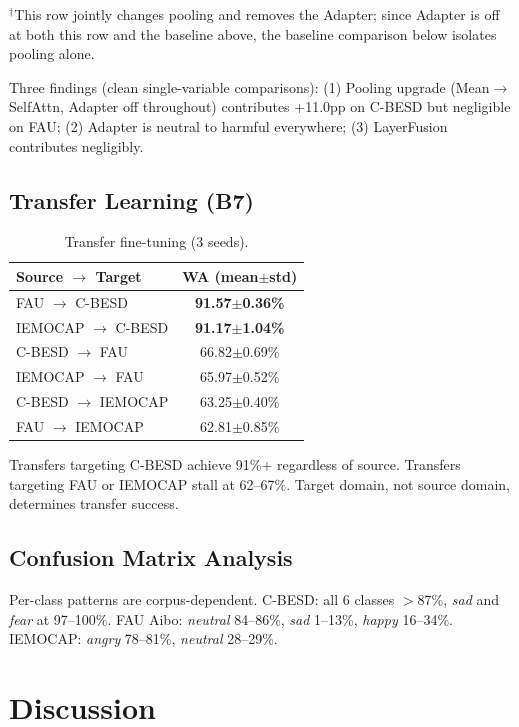 \documentclass[11pt,a4paper]{article}
\begin{document}
\noindent $^\dagger$This row jointly changes pooling and removes the Adapter; since Adapter is off at both this row and the baseline above, the baseline comparison below isolates pooling alone.

Three findings (clean single-variable comparisons): (1) Pooling upgrade (Mean$\rightarrow$SelfAttn, Adapter off throughout) contributes +11.0pp on C-BESD but negligible on FAU; (2) Adapter is neutral to harmful everywhere; (3) LayerFusion contributes negligibly.

\subsection{Transfer Learning (B7)}

\begin{table}[h]
\centering
\caption{Transfer fine-tuning (3 seeds).}
\begin{tabular}{lc}
\hline
\textbf{Source $\rightarrow$ Target} & \textbf{WA (mean$\pm$std)} \\
\hline
FAU $\rightarrow$ C-BESD & \textbf{91.57$\pm$0.36\%} \\
IEMOCAP $\rightarrow$ C-BESD & \textbf{91.17$\pm$1.04\%} \\
C-BESD $\rightarrow$ FAU & 66.82$\pm$0.69\% \\
IEMOCAP $\rightarrow$ FAU & 65.97$\pm$0.52\% \\
C-BESD $\rightarrow$ IEMOCAP & 63.25$\pm$0.40\% \\
FAU $\rightarrow$ IEMOCAP & 62.81$\pm$0.85\% \\
\hline
\end{tabular}
\end{table}

Transfers targeting C-BESD achieve 91\%+ regardless of source. Transfers targeting FAU or IEMOCAP stall at 62--67\%. Target domain, not source domain, determines transfer success.

\subsection{Confusion Matrix Analysis}

Per-class patterns are corpus-dependent. C-BESD: all 6 classes $>$87\%, \textit{sad} and \textit{fear} at 97--100\%. FAU Aibo: \textit{neutral} 84--86\%, \textit{sad} 1--13\%, \textit{happy} 16--34\%. IEMOCAP: \textit{angry} 78--81\%, \textit{neutral} 28--29\%.

\section{Discussion}
\end{document}
